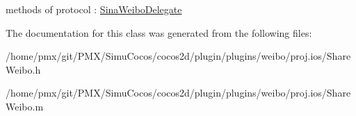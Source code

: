 methods of protocol \+: \hyperlink{classSinaWeiboDelegate-p}{Sina\+Weibo\+Delegate} 

The documentation for this class was generated from the following files\+:\begin{DoxyCompactItemize}
\item 
/home/pmx/git/\+P\+M\+X/\+Simu\+Cocos/cocos2d/plugin/plugins/weibo/proj.\+ios/Share\+Weibo.\+h\item 
/home/pmx/git/\+P\+M\+X/\+Simu\+Cocos/cocos2d/plugin/plugins/weibo/proj.\+ios/Share\+Weibo.\+m\end{DoxyCompactItemize}
